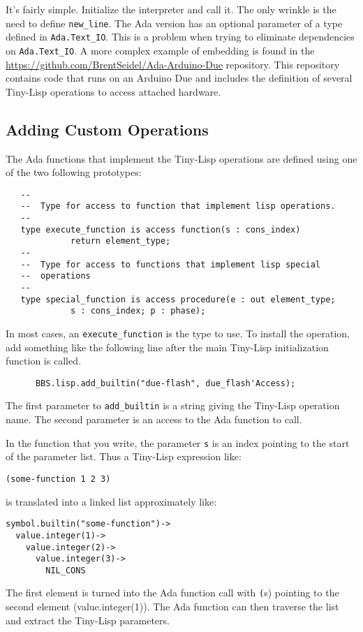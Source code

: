 \documentclass[10pt, openany]{book}
\newcommand{\package}[1]{\texttt{#1}}
\newcommand{\function}[1]{\texttt{#1}}
\newcommand{\keyword}[1]{\texttt{#1}}
\newcommand{\datatype}[1]{\texttt{#1}}
\newcommand{\tl}{Tiny-Lisp}
\begin{document}
It's fairly simple.  Initialize the interpreter and call it.  The only wrinkle is the need to define \function{new\_line}.  The Ada version has an optional parameter of a type defined in \package{Ada.Text\_IO}.  This is a problem when trying to eliminate dependencies on \package{Ada.Text\_IO}.  A more complex example of embedding is found in the \url{https://github.com/BrentSeidel/Ada-Arduino-Due} repository.  This repository contains code that runs on an Arduino Due and includes the definition of several \tl{} operations to access attached hardware.

\subsection{Adding Custom Operations}
The Ada functions that implement the \tl{} operations are defined using one of the two following prototypes:
\begin{lstlisting}
   --
   --  Type for access to function that implement lisp operations.
   --
   type execute_function is access function(s : cons_index)
             return element_type;
   --
   --  Type for access to functions that implement lisp special
   --  operations
   --
   type special_function is access procedure(e : out element_type;
             s : cons_index; p : phase);
\end{lstlisting}
In most cases, an \datatype{execute\_function} is the type to use.  To install the operation, add something like the following line after the main \tl{} initialization function is called.
\begin{lstlisting}
      BBS.lisp.add_builtin("due-flash", due_flash'Access);
\end{lstlisting}
The first parameter to \keyword{add\_builtin} is a string giving the \tl{} operation name.  The second parameter is an access to the Ada function to call.

In the function that you write, the parameter \keyword{s} is an index pointing to the start of the parameter list.  Thus a \tl{} expression like:
\lstset{language=[Tiny]Lisp}
\begin{lstlisting}
(some-function 1 2 3)
\end{lstlisting}
is translated into a linked list approximately like:
\begin{lstlisting}
symbol.builtin("some-function")->
  value.integer(1)->
    value.integer(2)->
      value.integer(3)->
        NIL_CONS
\end{lstlisting}
The first element is turned into the Ada function call with \keyword(s) pointing to the second element (value.integer(1)).  The Ada function can then traverse the list and extract the \tl{} parameters.
\lstset{language=Ada}
\end{document}

